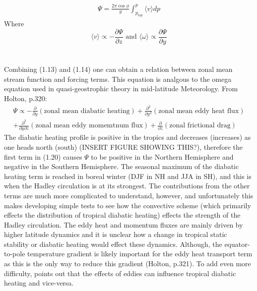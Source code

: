 \documentclass[letterpaper,12pt,titlepage,oneside,final]{book}
\begin{document}
\begin{align}
\Psi=\frac{2\pi\cos{\phi}}{g}\int_{p_{top}}^{p} \langle{v}\rangle{dp}
\end{align}
Where
\begin{equation}\label{eq:test}
\langle{v}\rangle \propto -\frac{\partial{\Psi}}{\partial{z}} \text{ and } \langle{\omega}\rangle \propto\frac{\partial{\Psi}}{\partial{y}}
\end{equation}
\\
\\
Combining (1.13) and (1.14) one can obtain a relation between zonal mean stream function and forcing terms. This equation is analgous to the omega equation used in quasi-geostrophic theory in mid-latitude Meteorology. From Holton, p.320:
\begin{equation}
\begin{split}
\Psi \propto -\frac{\partial}{\partial{y}}(\text{zonal mean diabatic heating}) + \frac{\partial^{2}}{\partial{y^{2}}}(\text{zonal mean eddy heat flux}) \\ + \frac{\partial^{2}}{\partial{y}\partial{z}}(\text{zonal mean eddy momemtnum flux}) + \frac{\partial}{\partial{z}}(\text{zonal frictional drag}) 
\end{split}
\end{equation}
The diabatic heating profile is positive in the tropics and decreases (increases) as one heads north (south) (INSERT FIGURE SHOWING THIS?), therefore the first term in (1.20) causes $\Psi$ to be positive in the Northern Hemisphere and negative in the Southern Hemisphere. The seasonal maximum of the diabatic heating term is reached in boreal winter (DJF in NH and JJA in SH), and this is when the Hadley circulation is at its strongest. The contributions from the other terms are much more complicated to understand, however, and unfortunately this makes developing simple tests to see how the convective scheme (which primarily effects the distribution of tropical diabatic heating) effects the strength of the Hadley circulation. The eddy heat and momentum fluxes are mainly driven by higher latitude dynamics and it is unclear how a change in tropical static stability or diabatic heating would effect these dynamics. Although, the equator-to-pole temperature gradient is likely important for the eddy heat transport term as this is the only way to reduce this gradient (Holton, p.321). To add even more difficulty, \cite{kim_hadley_2001} points out that the effects of eddies can influence tropical diabatic heating and vice-versa.
\end{document}
